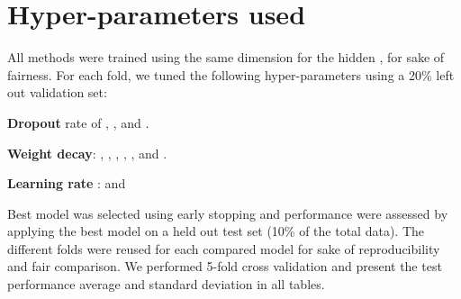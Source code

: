 \documentclass{article}
\begin{document}
\section{Hyper-parameters used}
\label{app:hyper-params}

All methods were trained using the same dimension for the hidden , for sake of fairness. For each fold, we tuned the following hyper-parameters using a 20\% left out validation set:

\textbf{Dropout} rate of , ,  and .

\textbf{Weight decay}: , , , , ,  and .

\textbf{Learning rate} :  and 

Best model was selected using early stopping and performance were assessed by applying the best model on a held out test set (10\% of the total data). The different folds were reused for each compared model for sake of reproducibility and fair comparison. We performed 5-fold cross validation and present the test performance average and standard deviation in all tables.
\end{document}
